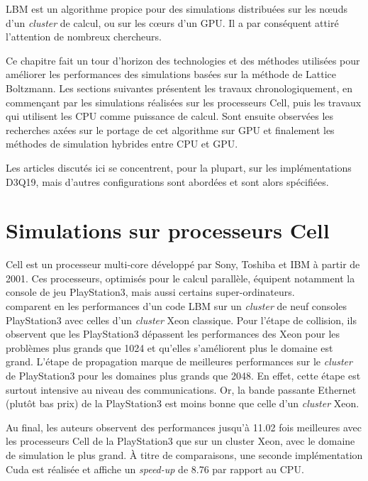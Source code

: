 \acs{LBM} est un algorithme propice pour des simulations distribuées sur les nœuds d'un \textit{cluster} de calcul, ou sur les cœurs d'un \acs{GPU}. Il a par conséquent attiré l'attention de nombreux chercheurs. 

Ce chapitre fait un tour d'horizon des technologies et des méthodes utilisées pour améliorer les performances des simulations basées sur la méthode de Lattice Boltzmann. Les sections suivantes présentent les travaux chronologiquement, en commençant par les simulations réalisées sur les processeurs Cell, puis les travaux qui utilisent les \acs{CPU} comme puissance de calcul. Sont ensuite  observées les recherches axées sur le portage de cet algorithme sur \acs{GPU} et finalement les méthodes de simulation hybrides entre \acs{CPU} et \acs{GPU}.

Les articles discutés ici se concentrent, pour la plupart, sur les implémentations D3Q19, mais d'autres configurations sont abordées et sont alors spécifiées.

\section{Simulations sur processeurs Cell}
Cell est un processeur multi-core développé par Sony, Toshiba et IBM à partir de 2001. Ces processeurs, optimisés pour le calcul parallèle, équipent notamment la console de jeu PlayStation3, mais aussi certains super-ordinateurs.\\

\citet{peng_parallel_2008} comparent en \citeyear{peng_parallel_2008} les performances d'un code \acs{LBM} sur un \textit{cluster} de neuf consoles PlayStation3 avec celles d'un \textit{cluster} Xeon classique. Pour l'étape de collision, ils observent que les PlayStation3 dépassent les performances des Xeon pour les problèmes plus grands que 1024 et qu'elles s'améliorent plus le domaine est grand. L'étape de propagation marque de meilleures performances sur le \textit{cluster} de PlayStation3 pour les domaines plus grands que 2048. En effet, cette étape est surtout intensive au niveau des communications. Or, la bande passante Ethernet (plutôt bas prix) de la PlayStation3 est moins bonne que celle d'un \textit{cluster} Xeon.

Au final, les auteurs observent des performances jusqu'à 11.02 fois meilleures avec les processeurs Cell de la PlayStation3 que sur un cluster Xeon, avec le domaine de simulation le plus grand. À titre de comparaisons, une seconde implémentation Cuda est réalisée et affiche un \textit{speed-up} de 8.76 par rapport au \acs{CPU}.\\

